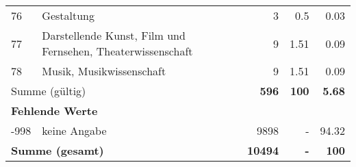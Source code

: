 \begin{longtable}{lXrrr}
        76 & \multicolumn{1}{X}{Gestaltung} & %
          \num{3} &
          \num[round-mode=places,round-precision=2]{0.5} &
          \num[round-mode=places,round-precision=2]{0.03} \\

        77 & \multicolumn{1}{X}{Darstellende Kunst, Film und Fernsehen, Theaterwissenschaft} & %
          \num{9} &
          \num[round-mode=places,round-precision=2]{1.51} &
          \num[round-mode=places,round-precision=2]{0.09} \\

        78 & \multicolumn{1}{X}{Musik, Musikwissenschaft} & %
          \num{9} &
          \num[round-mode=places,round-precision=2]{1.51} &
          \num[round-mode=places,round-precision=2]{0.09} \\

     \midrule
     \multicolumn{2}{l}{Summe (gültig)} &
       \textbf{\num{596}} &
     \textbf{\num{100}} &
       \textbf{\num[round-mode=places,round-precision=2]{5.68}} \\
     \multicolumn{5}{l}{\textbf{Fehlende Werte}}\\
       -998 &
       keine Angabe &
         \num{9898} &
        - &
         \num[round-mode=places,round-precision=2]{94.32} \\
     \midrule
     \multicolumn{2}{l}{\textbf{Summe (gesamt)}} &
          \textbf{\num{10494}} &
        \textbf{-} &
        \textbf{\num{100}} \\
     \bottomrule
     \end{longtable}
     
